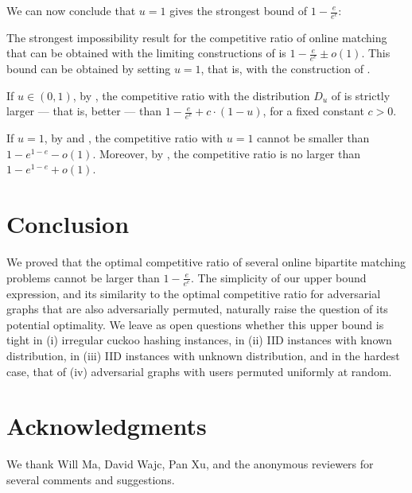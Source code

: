 \documentclass[11pt]{article}
\begin{document}
We can now conclude that $u = 1$ gives the strongest bound of $1-\frac{e}{e^e}$:\begin{theoremrep}\label{thm:optimal_u}
The strongest impossibility result for the competitive ratio of online matching that can be obtained with the limiting constructions of  is $1 - \frac{e}{e^e} \pm o(1)$. This bound can be obtained by setting $u = 1$, that is, with the construction of .   
\end{theoremrep}
\begin{appendixproof}
If $u \in (0,1)$, by , the competitive ratio with the distribution $D_u$ of  is strictly larger --- that is, better --- than $1 - \frac e{e^e} + c \cdot (1-u)$, for a fixed constant $c > 0$. 
    
If $u = 1$, by  and , the competitive ratio with $u=1$ cannot be smaller than $1-e^{1-e}-o(1)$. Moreover, by , the competitive ratio is no larger than $1- e^{1-e} + o(1)$. 
\end{appendixproof}


\section{Conclusion}\label{sec:conclusion}
We proved that the optimal competitive ratio of several online bipartite matching problems cannot be larger than $1-\frac{e}{e^e}$. The simplicity of our upper bound expression, and its similarity to the optimal competitive ratio for adversarial graphs that are also adversarially permuted, naturally raise the question of its potential optimality. We leave as open questions whether this upper bound is tight in (i) irregular cuckoo hashing instances, in (ii) IID instances with known distribution, in (iii) IID instances with unknown distribution, and in the hardest case, that of (iv) adversarial graphs with users permuted uniformly at random.

\section*{Acknowledgments}
We thank Will Ma, David Wajc, Pan Xu, and the anonymous reviewers for several comments and suggestions.





\newpage
\appendix
\end{document}
